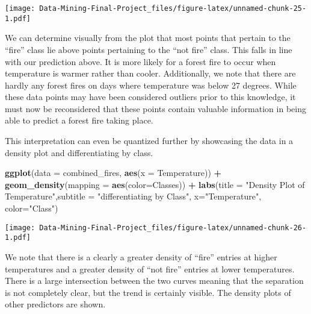 \documentclass[
]{article}
\newenvironment{Shaded}{\begin{snugshade}}{\end{snugshade}}
\newcommand{\AttributeTok}[1]{\textcolor[rgb]{0.13,0.29,0.53}{#1}}
\newcommand{\FunctionTok}[1]{\textcolor[rgb]{0.13,0.29,0.53}{\textbf{#1}}}
\newcommand{\NormalTok}[1]{#1}
\newcommand{\SpecialCharTok}[1]{\textcolor[rgb]{0.81,0.36,0.00}{\textbf{#1}}}
\newcommand{\StringTok}[1]{\textcolor[rgb]{0.31,0.60,0.02}{#1}}
\begin{document}
\texttt{[image: Data-Mining-Final-Project\_files/figure-latex/unnamed-chunk-25-1.pdf]}

We can determine visually from the plot that most points that pertain to
the ``fire'' class lie above points pertaining to the ``not fire''
class. This falls in line with our prediction above. It is more likely
for a forest fire to occur when temperature is warmer rather than
cooler. Additionally, we note that there are hardly any forest fires on
days where temperature was below 27 degrees. While these data points may
have been considered outliers prior to this knowledge, it must now be
reconsidered that these points contain valuable information in being
able to predict a forest fire taking place.

This interpretation can even be quantized further by showcasing the data
in a density plot and differentiating by class.

\begin{Shaded}
\begin{Highlighting}[]
\FunctionTok{ggplot}\NormalTok{(}\AttributeTok{data =}\NormalTok{ combined\_fires, }\FunctionTok{aes}\NormalTok{(}\AttributeTok{x =}\NormalTok{ Temperature)) }\SpecialCharTok{+} \FunctionTok{geom\_density}\NormalTok{(}\AttributeTok{mapping =} \FunctionTok{aes}\NormalTok{(}\AttributeTok{color=}\NormalTok{Classes)) }\SpecialCharTok{+} \FunctionTok{labs}\NormalTok{(}\AttributeTok{title =} \StringTok{"Density Plot of Temperature"}\NormalTok{,}\AttributeTok{subtitle =} \StringTok{"differentiating by Class"}\NormalTok{, }\AttributeTok{x=}\StringTok{"Temperature"}\NormalTok{, }\AttributeTok{color=}\StringTok{"Class"}\NormalTok{)}
\end{Highlighting}
\end{Shaded}

\texttt{[image: Data-Mining-Final-Project\_files/figure-latex/unnamed-chunk-26-1.pdf]}

We note that there is a clearly a greater density of ``fire'' entries at
higher temperatures and a greater density of ``not fire'' entries at
lower temperatures. There is a large intersection between the two curves
meaning that the separation is not completely clear, but the trend is
certainly visible. The density plots of other predictors are shown.
\end{document}
